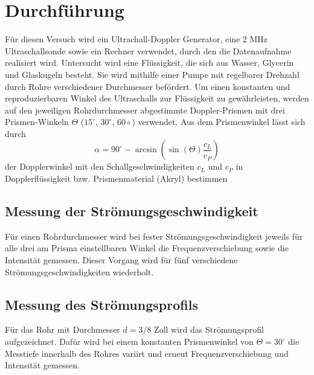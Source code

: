 \section{Durchführung}
Für diesen Versuch wird ein Ultrachall-Doppler Generator, eine $2$ MHz Ultraschallsonde sowie ein Rechner verwendet, durch den die Datenaufnahme realisiert wird. Untersucht wird eine Flüssigkeit, die sich aus Wasser, Glycerin und Glaskugeln besteht. Sie wird mithilfe einer Pumpe mit regelbarer Drehzahl durch Rohre verschiedener Durchmesser befördert. Um einen konstanten und reproduzierbaren Winkel des Ultraschalls zur Flüssigkeit zu gewährleisten, werden auf den jeweiligen Rohrdurchmesser abgestimmte Doppler-Prismen mit drei Prismen-Winkeln $\Theta$ ($15^\circ$, $30^\circ$, $60\circ$) verwendet. Aus dem Prismenwinkel lässt sich durch
\begin{equation}
\alpha =90^\circ-\arcsin(\sin(\Theta)\frac{c_L}{c_P})
\end{equation}
der Dopplerwinkel mit den Schallgeschwindigkeiten $c_L$ und $c_P$ in Dopplerflüssigkeit bzw. Prismenmaterial (Akryl) bestimmen\\
\subsection{Messung der Strömungsgeschwindigkeit}
Für einen Rohrdurchmesser wird bei fester Strömungsgeschwindigkeit jeweils für alle drei am Prisma einstellbaren Winkel die Frequenzverschiebung sowie die Intensität gemessen. Dieser Vorgang wird für fünf verschiedene Strömungsgeschwindigkeiten wiederholt.
\subsection{Messung des Strömungsprofils}
Für das Rohr mit Durchmesser  $d=3/8$ Zoll wird das Strömungsprofil aufgezeichnet. Dafür wird bei einem konstanten Prismenwinkel von $\Theta=30^\circ$ die Messtiefe innerhalb des Rohres variirt und erneut Frequenzverschiebung und Intensität gemessen.
